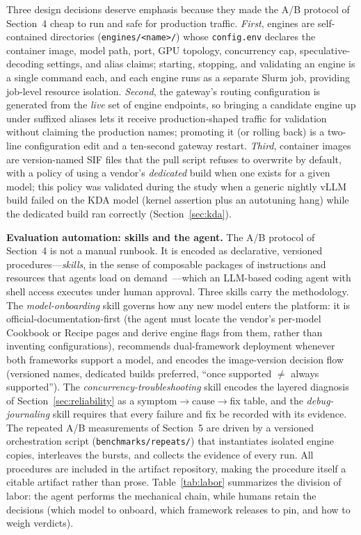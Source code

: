 \documentclass[11pt]{article}
\begin{document}
Three design decisions deserve emphasis because they made the A/B protocol of Section~4 cheap to run and safe for production traffic. \emph{First}, engines are self-contained directories (\texttt{engines/<name>/}) whose \texttt{config.env} declares the container image, model path, port, GPU topology, concurrency cap, speculative-decoding settings, and alias claims; starting, stopping, and validating an engine is a single command each, and each engine runs as a separate Slurm job, providing job-level resource isolation. \emph{Second}, the gateway's routing configuration is generated from the \emph{live} set of engine endpoints, so bringing a candidate engine up under suffixed aliases lets it receive production-shaped traffic for validation without claiming the production names; promoting it (or rolling back) is a two-line configuration edit and a ten-second gateway restart. \emph{Third}, container images are version-named SIF files that the pull script refuses to overwrite by default, with a policy of using a vendor's \emph{dedicated} build when one exists for a given model; this policy was validated during the study when a generic nightly vLLM build failed on the KDA model (kernel assertion plus an autotuning hang) while the dedicated build ran correctly (Section~\ref{sec:kda}).

\textbf{Evaluation automation: skills and the agent.} The A/B protocol of Section~4 is not a manual runbook. It is encoded as declarative, versioned procedures---\emph{skills}, in the sense of composable packages of instructions and resources that agents load on demand~\cite{xu2026agentskills}---which an LLM-based coding agent with shell access executes under human approval. Three skills carry the methodology. The \emph{model-onboarding} skill governs how any new model enters the platform: it is official-documentation-first (the agent must locate the vendor's per-model Cookbook or Recipe pages and derive engine flags from them, rather than inventing configurations), recommends dual-framework deployment whenever both frameworks support a model, and encodes the image-version decision flow (versioned names, dedicated builds preferred, ``once supported $\ne$ always supported''). The \emph{concurrency-troubleshooting} skill encodes the layered diagnosis of Section~\ref{sec:reliability} as a symptom$\rightarrow$cause$\rightarrow$fix table, and the \emph{debug-journaling} skill requires that every failure and fix be recorded with its evidence. The repeated A/B measurements of Section~5 are driven by a versioned orchestration script (\texttt{benchmarks/repeats/}) that instantiates isolated engine copies, interleaves the bursts, and collects the evidence of every run. All procedures are included in the artifact repository, making the procedure itself a citable artifact rather than prose. Table~\ref{tab:labor} summarizes the division of labor: the agent performs the mechanical chain, while humans retain the decisions (which model to onboard, which framework releases to pin, and how to weigh verdicts).
\end{document}
